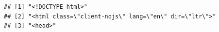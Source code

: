 \documentclass[
  12pt,
]{style/krantz}
\begin{document}
\begin{verbatim}
## [1] "<!DOCTYPE html>"                                                                                                                                                                                                                                                                                                                                                                                                                                                                                                                                                                                                                                                                                                                                                                                                                                                                                                                                                                                                                                                                                                                     
## [2] "<html class=\"client-nojs\" lang=\"en\" dir=\"ltr\">"                                                                                                                                                                                                                                                                                                                                                                                                                                                                                                                                                                                                                                                                                                                                                                                                                                                                                                                                                                                                                                                                                
## [3] "<head>"                                                                                                                                                                                                                                                                                                                                                                                                                                                                                                                                                                                                                                                                                                                                                                                                                                                                                                                                                                                                                                                                                                                              

\end{verbatim}
\end{document}
